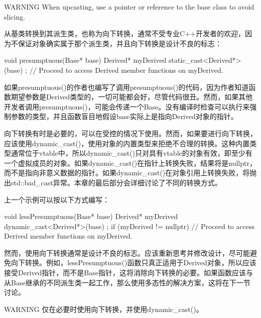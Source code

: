 \begin{myWarning}{WARNING}
When upcasting, use a pointer or reference to the base class to avoid slicing.
\end{myWarning}

从基类转换到其派生类，也称为向下转换，通常不受专业C++开发者的欢迎，因为不保证对象确实属于那个派生类，并且向下转换是设计不良的标志：

\begin{cpp}
void presumptuous(Base* base)
{
    Derived* myDerived { static_cast<Derived*>(base) };
    // Proceed to access Derived member functions on myDerived.
}
\end{cpp}

如果presumptuous()的作者也编写了调用presumptuous()的代码，因为作者知道函数期望参数是Derived类型的，一切可能都会好，尽管代码很丑。然而，如果其他开发者调用presumptuous()，可能会传递一个Base。没有编译时检查可以执行来强制参数的类型，并且函数盲目地假设base实际上是指向Derived对象的指针。

向下转换有时是必要的，可以在受控的情况下使用。然而，如果要进行向下转换，应该使用dynamic\_cast()，使用对象的内置类型来拒绝不合理的转换。这种内置类型通常位于vtable中，所以dynamic\_cast()只对具有vtable的对象有效，即至少有一个虚拟成员的对象。如果dynamic\_cast()在指针上转换失败，结果将是nullptr，而不是指向非意义数据的指针。如果dynamic\_cast()在对象引用上转换失败，将抛出std::bad\_cast异常。本章的最后部分会详细讨论了不同的转换方式。

上一个示例可以按以下方式编写：

\begin{cpp}
void lessPresumptuous(Base* base)
{
    Derived* myDerived { dynamic_cast<Derived*>(base) };
    if (myDerived != nullptr) {
        // Proceed to access Derived member functions on myDerived.
    }
}
\end{cpp}

然而，使用向下转换通常是设计不良的标志。应该重新思考并修改设计，尽可能避免向下转换。例如，lessPresumptuous()函数只真正适用于Derived对象，所以应该接受Derived指针，而不是Base指针，这将消除向下转换的必要。如果函数应该与从Base继承的不同派生类一起工作，那么使用多态性的解决方案，这将在下一节讨论。

\begin{myWarning}{WARNING}
仅在必要时使用向下转换，并使用dynamic\_cast()。
\end{myWarning}






